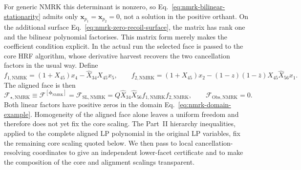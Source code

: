 \documentclass[a4paper,11pt]{article}
\begin{document}
For generic NMRK this determinant is nonzero, so
Eq.~\eqref{eq:nmrk-bilinear-stationarity} admits only
\(\boldsymbol x_{p_1}=\boldsymbol x_{p_2}=0\), not a
solution in the positive
orthant.  On the additional surface
Eq.~\eqref{eq:nmrk-zero-recoil-surface}, the matrix has rank one and the
bilinear polynomial factorises.  This matrix form merely makes the
coefficient condition explicit.  In the actual run the selected face is
passed to the core HRF algorithm, whose derivative harvest recovers the two
cancellation factors in the usual way.  Define
\begin{equation}
 f_{1,\mathrm{NMRK}}=(1+X_{45})x_4-\widehat X_{34}X_{45}x_5,\qquad
 f_{2,\mathrm{NMRK}}=(1+X_{45})x_2
 -(1-z)(1-\bar z)X_{45}\widehat X_{56}x_1.
 \label{eq:nmrk-factors-example}
\end{equation}
The aligned face is then
\begin{equation}
 \mathcal F_{\star,\mathrm{NMRK}}
 \equiv\mathcal F^{[\boldsymbol\phi_{\mathrm{NMRK}}]}
 =\mathcal F_{\mathrm{SL,NMRK}}
 =Q\widehat X_{34}\widehat X_{56}
 f_{1,\mathrm{NMRK}}f_{2,\mathrm{NMRK}},
 \qquad \mathcal F_{\mathrm{Obs,NMRK}}=0.
 \label{eq:nmrk-decomposition-example}
\end{equation}
Both linear factors have positive zeros in the domain
Eq.~\eqref{eq:nmrk-domain-example}.  Homogeneity of the aligned face alone
leaves a uniform freedom and therefore does not yet fix the core scaling.
The Part~II hierarchy inequalities, applied to the complete aligned LP
polynomial in the original LP variables, fix the remaining core scaling
quoted below.  We then pass to local cancellation-resolving coordinates to
give an independent lower-facet certificate and to make the composition of
the core and alignment scalings transparent.
\end{document}
